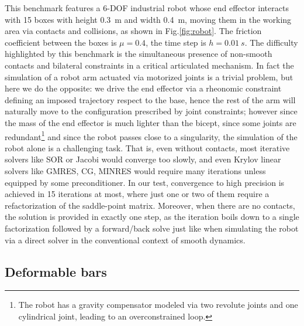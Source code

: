 \documentclass[final,3p]{elsarticle}
\begin{document}
This benchmark features a 6-DOF industrial robot whose end effector interacts with 15 boxes with height \SI{0.3}{m} and width \SI{0.4}{m}, moving them in the working area via contacts and collisions, as shown in Fig.\ref{fig:robot}. The friction coefficient between the boxes is $\mu=0.4$, the time step is $h=\SI{0.01}{s}$. The difficulty highlighted by this benchmark is the simultaneous presence of non-smooth contacts and bilateral constraints in a critical articulated mechanism. In fact the simulation of a robot arm actuated via motorized joints is a trivial problem, but here we do the opposite: we drive the end effector via a rheonomic constraint defining an imposed trajectory respect to the base, hence the rest of the arm will naturally move to the configuration prescribed by joint constraints; however since the mass of the end effector is much lighter than the bicept, since some joints are redundant\footnote{The robot has a gravity compensator modeled via two revolute joints and one cylindrical joint, leading to an overconstrained loop.} and since the robot passes close to a singularity, the simulation of the robot alone is a challenging task. That is, even without contacts, most iterative solvers like SOR or Jacobi would converge too slowly, and even Krylov linear solvers like GMRES, CG, MINRES would require many iterations unless equipped by some preconditioner. In our test, convergence to high precision is achieved in 15 iterations at most, where just one or two of them require a refactorization of the saddle-point matrix. Moreover, when there are no contacts, the solution is provided in exactly one step, as the iteration boils down to a single factorization followed by a forward/back solve just like when simulating the robot via a direct solver in the conventional context of smooth dynamics.
 


\subsection{Deformable bars}
\end{document}

